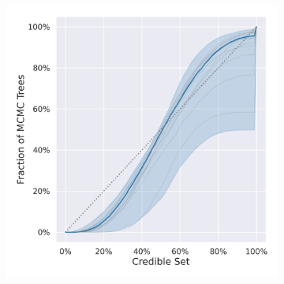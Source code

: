 \documentclass[10pt,letterpaper]{article}
\begin{document}
\begin{figure}
	\caption{The credible-region plots for different datasets and distributions. The plot shows the fraction of MCMC trees contained in the smallest $\gamma$-credible region for different $\gamma$. The closer the resulting line is to the $x=y$ line the better. The blue line shows the median line for the datasets; 95 \% of all datasets fall into the blue region. The grey lines the credible-region plots for 10 random datasets.}
	
	\centering
	\begin{subfigure}[b]{0.45\textwidth}
		\centering
		\includegraphics[width=\textwidth]{figures/yule-200-ccd1-credible-sets-Height (LogNormal), Ratios (Beta).png}
	\end{subfigure}
	\begin{subfigure}[b]{0.4\textwidth}
		\centering

\end{subfigure}
\end{figure}
\end{document}
